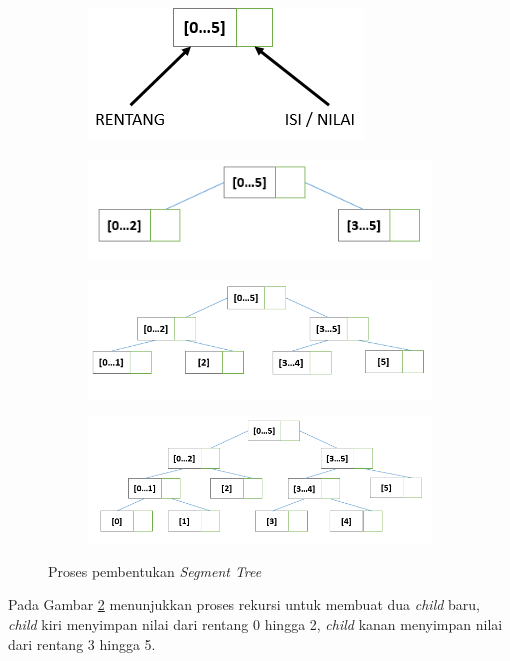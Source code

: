 \begin{figure}[H]
	\begin{subfigure}{.5\textwidth}
		\centering
		\includegraphics[scale=0.45]{assets/images/pembentukan_ST_1.PNG}
		\caption{}
		\label{fig:subbentukST1}
	\end{subfigure}
	\begin{subfigure}{.5\textwidth}
		\centering
		\includegraphics[scale=0.45]{assets/images/pembentukan_ST_2.PNG}
		\caption{}
		\label{fig:subbentukST2}
	\end{subfigure}
	\begin{subfigure}{.5\textwidth}
		\centering \includegraphics[scale=0.3]{assets/images/pembentukan_ST_3.PNG}
		\caption{}
		\label{fig:subbentukST3}
	\end{subfigure}
		\begin{subfigure}{.5\textwidth}
			\centering
			\includegraphics[scale=0.3]{assets/images/pembentukan_ST_4.PNG}
			\caption{}
			\label{fig:subbentukST4}
		\end{subfigure}	
	\caption{Proses pembentukan \textit{Segment Tree}}
	\label{fig:bentukST1}
\end{figure}
\quad Pada Gambar \ref{fig:subbentukST2} menunjukkan proses rekursi untuk membuat dua \textit{child} baru, \textit{child} kiri menyimpan nilai dari rentang 0 hingga 2, \textit{child} kanan menyimpan nilai dari rentang 3 hingga 5.

